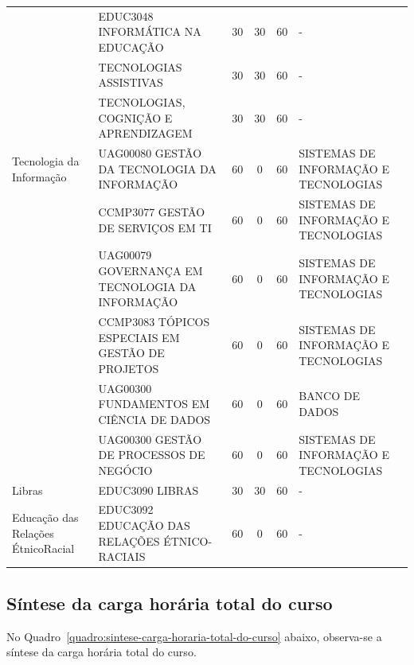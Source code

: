 \documentclass[
	12pt,				%
	openright,			%
  oneside,     %
	a4paper,			%
 hyphens,
	chapter=TITLE,		%
	english,			%
	french,				%
	spanish,			%
	brazil				%
	]{abntex2}
\begin{document}
\begin{center}
\begin{tiny}
\begin{longtable}{p{2.5cm}p{5.5cm}cccp{3.3cm}}
      & EDUC3048 INFORMÁTICA NA EDUCAÇÃO & 30 & 30 & 60 & - \\ \cline{2-6}
      & TECNOLOGIAS ASSISTIVAS & 30 & 30 & 60 & - \\ \cline{2-6}
      & TECNOLOGIAS, COGNIÇÃO E APRENDIZAGEM & 30 & 30 & 60 & - \\ \midrule
    Tecnologia da Informação & UAG00080 GESTÃO DA TECNOLOGIA DA INFORMAÇÃO & 60 & 0 & 60 & SISTEMAS DE INFORMAÇÃO E TECNOLOGIAS \\ \cline{2-6}
      & CCMP3077 GESTÃO DE SERVIÇOS EM TI & 60 & 0 & 60 & SISTEMAS DE INFORMAÇÃO E TECNOLOGIAS \\ \cline{2-6}
      & UAG00079 GOVERNANÇA EM TECNOLOGIA DA INFORMAÇÃO & 60 & 0 & 60 & SISTEMAS DE INFORMAÇÃO E TECNOLOGIAS \\ \cline{2-6}
      & CCMP3083 TÓPICOS ESPECIAIS EM GESTÃO DE PROJETOS & 60 & 0 & 60 & SISTEMAS DE INFORMAÇÃO E TECNOLOGIAS \\ \cline{2-6}
      & UAG00300 FUNDAMENTOS EM CIÊNCIA DE DADOS & 60 & 0 & 60 & BANCO DE DADOS \\ \cline{2-6}
      & UAG00300 GESTÃO DE PROCESSOS DE NEGÓCIO & 60 & 0 & 60 & SISTEMAS DE INFORMAÇÃO E TECNOLOGIAS \\ \midrule
    Libras & EDUC3090 LIBRAS & 30 & 30 & 60 & - \\ \midrule
    Educação das Relações Étnico\-Racial & EDUC3092  EDUCAÇÃO DAS RELAÇÕES ÉTNICO-RACIAIS & 60 & 0 & 60 & - \\
  \bottomrule
  \end{longtable}
  \end{tiny}      
  \end{center}
  
  \subsection{Síntese da carga horária total do curso}
  
  No Quadro~\ref{quadro:sintese-carga-horaria-total-do-curso} abaixo, observa-se a síntese da carga horária total do curso.
  
\end{document}

